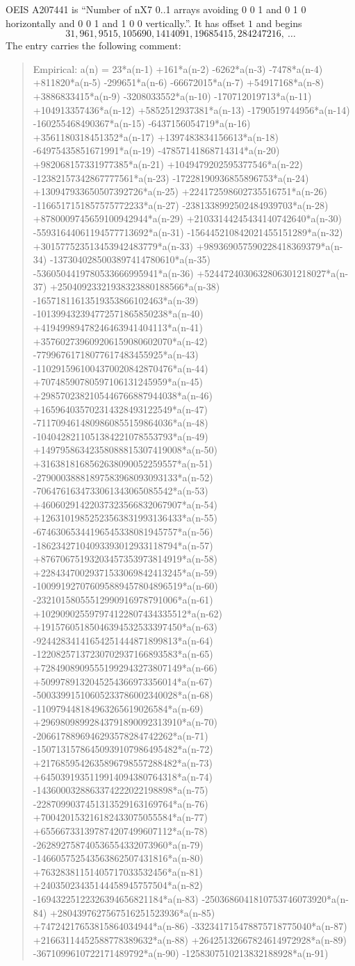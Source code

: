 \documentclass[11pt,a4paper]{article}
\theoremstyle{plain}
\theoremstyle{definition}
\begin{document}
OEIS A207441 is ``Number of nX7 0..1 arrays avoiding 0 0 1 and 0 1 0 horizontally and 0 0 1 and 1 0 0 vertically.''. It has offset
$1$ and begins
\[
31, 961, 9515, 105690, 1414091, 19685415, 284247216,\ \dots
\]
The entry carries the following comment:
\begin{quote}\small
Empirical: a(n) = 23*a(n-1) +161*a(n-2) -6262*a(n-3) -7478*a(n-4) +811820*a(n-5) -299651*a(n-6) -66672015*a(n-7) +54917168*a(n-8) +3886833415*a(n-9) -3208033552*a(n-10) -170712019713*a(n-11) +104913357436*a(n-12) +5852512937381*a(n-13) -1790519744956*a(n-14) -160255468490367*a(n-15) -6437156054719*a(n-16) +3561180318451352*a(n-17) +1397483834156613*a(n-18) -64975435851671991*a(n-19) -47857141868714314*a(n-20) +982068157331977385*a(n-21) +1049479202595377546*a(n-22) -12382157342867777561*a(n-23) -17228190936855896753*a(n-24) +130947933650507392726*a(n-25) +224172598602735516751*a(n-26) -1166517151857575772233*a(n-27) -2381338992502484939703*a(n-28) +8780009745659100942944*a(n-29) +21033144245434140742640*a(n-30) -55931644061194577713692*a(n-31) -156445210842021455151289*a(n-32) +301577523513453942483779*a(n-33) +989369057590228418369379*a(n-34) -1373040285003897414780610*a(n-35) -5360504419780533666995941*a(n-36) +5244724030632806301218027*a(n-37) +25040923321938323880188566*a(n-38) -16571811613519353866102463*a(n-39) -101399432394772571865850238*a(n-40) +41949989478246463941404113*a(n-41) +357602739609206159080602070*a(n-42) -77996761718077617483455925*a(n-43) -1102915961004370020842870476*a(n-44) +70748590780597106131245959*a(n-45) +2985702382105446766887944038*a(n-46) +165964035702314328493122549*a(n-47) -7117094614809860855159864036*a(n-48) -1040428211051384221078553793*a(n-49) +14979586342358088815307419008*a(n-50) +3163818168562638090052259557*a(n-51) -27900038881897583968093093133*a(n-52) -7064761634733061343065085542*a(n-53) +46060291422037323566832067907*a(n-54) +12631019852523563831993136433*a(n-55) -67463065344196545338081945757*a(n-56) -18623427104093393012933118794*a(n-57) +87670675193203457353973814919*a(n-58) +22843470029371533069842413245*a(n-59) -100991927076095889457804896519*a(n-60) -23210158055512990916978791006*a(n-61) +102909025597974122807434335512*a(n-62) +19157605185046394532533397450*a(n-63) -92442834141654251444871899813*a(n-64) -12208257137230702937166893583*a(n-65) +72849089095551992943273807149*a(n-66) +5099789132045254366973356014*a(n-67) -50033991510605233786002340028*a(n-68) -110979448184963265619026584*a(n-69) +29698098992843791890092313910*a(n-70) -2066178896946293578284742262*a(n-71) -15071315786450939107986495482*a(n-72) +2176859542635896798557288482*a(n-73) +6450391935119914094380764318*a(n-74) -1436000328863374222022198898*a(n-75) -2287099037451313529163169764*a(n-76) +700420153216182433075055584*a(n-77) +655667331397874207499607112*a(n-78) -262892758740536554332073960*a(n-79) -146605752543563862507431816*a(n-80) +76328381151405717033532456*a(n-81) +24035023435144458945757504*a(n-82) -16943225122326394656821184*a(n-83) -2503686041810753746073920*a(n-84) +2804397627567516251523936*a(n-85) +74724217653815864034944*a(n-86) -332341715478875718775040*a(n-87) +21663114452588778389632*a(n-88) +26425132667824614972928*a(n-89) -3671099610722171489792*a(n-90) -1258307510213832188928*a(n-91) 
\end{quote}
\end{document}
